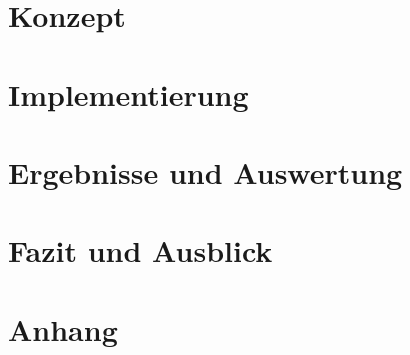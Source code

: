 \documentclass[enabledeprecatedfontcommands,12pt,a4paper,twoside,hyphens]{scrreprt}
\begin{document}
\chapter{Konzept}

\cleardoublepage

\chapter{Implementierung}

\cleardoublepage

\chapter{Ergebnisse und Auswertung}

\cleardoublepage

\chapter{Fazit und Ausblick}

\cleardoublepage





\chapter{Anhang}

\cleardoublepage

\newpage
\listoffigures
\end{document}

